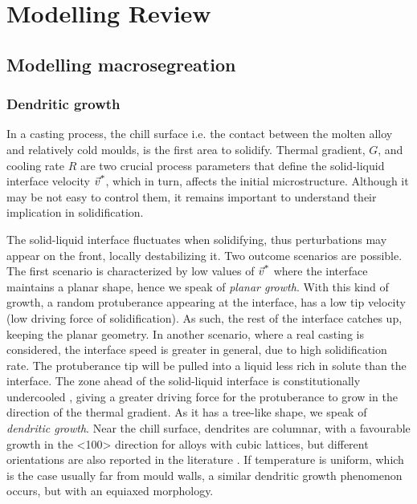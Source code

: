 \chapter{Modelling Review}
\begin{nolinkcolors} 
\minitoc
\end{nolinkcolors}
\newpage

\section{Modelling macrosegreation}
%
\subsection{Dendritic growth}
In a casting process, the chill surface i.e. the contact between the molten alloy and relatively cold moulds, is the first area to solidify. 
Thermal gradient, $G$, and cooling rate $R$ are two crucial process parameters that define the solid-liquid interface velocity $\vec{v}^\text{*}$, which in turn,
affects the initial microstructure. Although it may be not easy to control them, it remains important to understand their implication in solidification.

The solid-liquid interface fluctuates when solidifying, thus perturbations may appear on the front, locally destabilizing it. 
Two outcome scenarios are possible.
The first scenario is characterized by low values of $\vec{v}^\text{*}$ where the interface maintains a planar shape, hence we speak of \emph{planar growth}. 
With this kind of growth, a random protuberance appearing at the interface, has a low tip velocity (low driving force of solidification). As such,
the rest of the interface catches up, keeping the planar geometry.
In another scenario, where a real casting is considered, the interface speed is greater in general, due to high solidification rate.
The protuberance tip will be pulled into a liquid less rich in solute than the interface. The zone ahead of the solid-liquid interface is constitutionally undercooled \citep{tiller_redistribution_1953}, giving a greater driving force for the protuberance to grow in the direction
of the thermal gradient. As it has a tree-like shape, we speak of \emph{dendritic growth}. Near the chill surface, dendrites are columnar, with a 
favourable growth in the <100> direction for alloys with cubic lattices, but different orientations are also reported in the literature \citep[see][289]{dantzig_solidification_2009}.
If temperature is uniform, which is the case usually far from mould walls, a similar dendritic growth phenomenon occurs, but with an equiaxed morphology.

